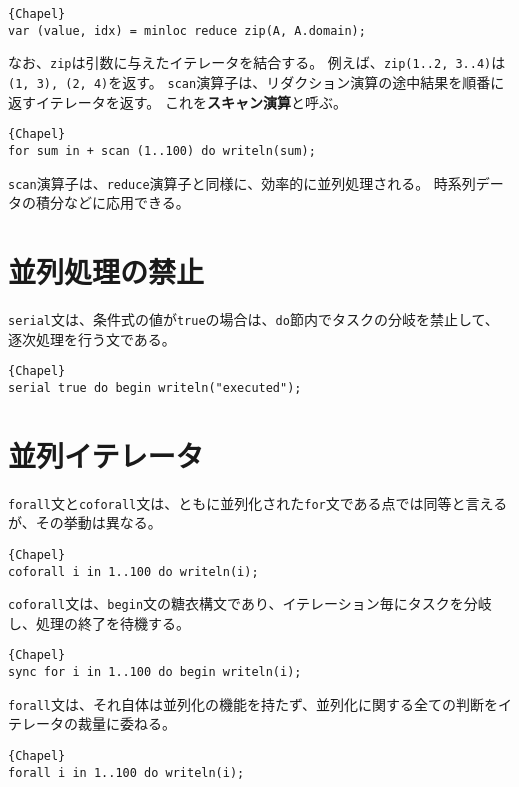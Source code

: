 \documentclass[10pt,a4paper]{book}
\begin{document}
\begin{Verbatim}{Chapel}
var (value, idx) = minloc reduce zip(A, A.domain);
\end{Verbatim}

なお、\verb#zip#は引数に与えたイテレータを結合する。
例えば、\verb#zip(1..2, 3..4)#は\verb#(1, 3), (2, 4)#を返す。
\verb#scan#演算子は、リダクション演算の途中結果を順番に返すイテレータを返す。
これを\textbf{スキャン演算}と呼ぶ。

\begin{Verbatim}{Chapel}
for sum in + scan (1..100) do writeln(sum);
\end{Verbatim}

\verb#scan#演算子は、\verb#reduce#演算子と同様に、効率的に並列処理される。
時系列データの積分などに応用できる。

\section{並列処理の禁止}

\verb#serial#文は、条件式の値が\verb#true#の場合は、\verb#do#節内でタスクの分岐を禁止して、逐次処理を行う文である。

\begin{Verbatim}{Chapel}
serial true do begin writeln("executed");
\end{Verbatim}

\section{並列イテレータ\label{sec:iter.parallel}}

\verb#forall#文と\verb#coforall#文は、ともに並列化された\verb#for#文である点では同等と言えるが、その挙動は異なる。

\begin{Verbatim}{Chapel}
coforall i in 1..100 do writeln(i);
\end{Verbatim}

\verb#coforall#文は、\verb#begin#文の糖衣構文であり、イテレーション毎にタスクを分岐し、処理の終了を待機する。

\begin{Verbatim}{Chapel}
sync for i in 1..100 do begin writeln(i);
\end{Verbatim}

\verb#forall#文は、それ自体は並列化の機能を持たず、並列化に関する全ての判断をイテレータの裁量に委ねる。

\begin{Verbatim}{Chapel}
forall i in 1..100 do writeln(i);
\end{Verbatim}
\end{document}

